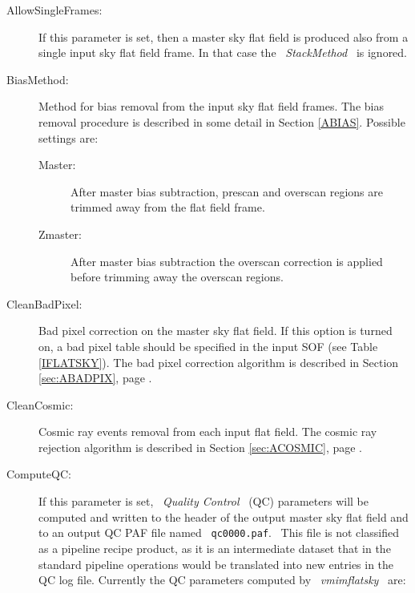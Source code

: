\begin{description}

\item [AllowSingleFrames:]  If this parameter is set, then a master sky
                        flat field is produced also from a single input 
                        sky flat field frame.
                        In that case the \ {\it StackMethod} \ is ignored.

\item [BiasMethod:]     Method for bias removal from the input sky
                        flat field frames.
                        The bias removal procedure is described in some
                        detail in Section \ref{ABIAS}. Possible settings are:

\begin{description}
  \item [Master:]       After master bias subtraction, prescan and
                        overscan regions are trimmed away from the
                        flat field frame.

  \item [Zmaster:]      After master bias subtraction the overscan correction
                        is applied before trimming away the overscan regions.
\end{description}

\item [CleanBadPixel:]  Bad pixel correction on the master sky flat field.
                        If this option is turned on, a bad pixel
                        table should be specified in the input SOF
                        (see Table \ref{IFLATSKY}). The bad pixel
                        correction algorithm is described in Section
                        \ref{sec:ABADPIX}, page \pageref{sec:ABADPIX}.

\item [CleanCosmic:]    Cosmic ray events removal from each input flat field.
                        The cosmic ray rejection algorithm is described 
                        in Section \ref{sec:ACOSMIC}, page \pageref{sec:ACOSMIC}.

\item [ComputeQC:]      If this parameter is set, \ {\it Quality Control}
                        \ (QC) parameters will be computed and written to 
                        the header of the output master sky flat field 
                        and to an 
                        output QC PAF file named \ {\tt qc0000.paf}. 
                        \ This file is not classified as a pipeline recipe 
                        product, as it is an intermediate dataset 
                        that in the standard pipeline operations would 
                        be translated into new entries in the QC log file. 
                        Currently the QC parameters computed by 
                        \ {\it vmimflatsky} \ are:


\end{description}
